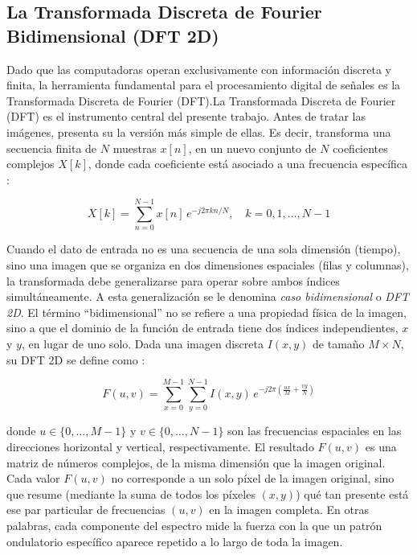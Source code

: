 \documentclass[conference]{IEEEtran}
\begin{document}
\subsection{La Transformada Discreta de Fourier Bidimensional (DFT 2D)}

Dado que las computadoras operan exclusivamente con información discreta y finita, la herramienta fundamental para el procesamiento digital de señales es la Transformada Discreta de Fourier (DFT).La Transformada Discreta de Fourier (DFT) es el instrumento central del presente trabajo. Antes de tratar las imágenes, presenta su la versión más simple de ellas. Es decir, transforma una secuencia finita de $N$ muestras $x[n]$, en un nuevo conjunto de $N$ coeficientes complejos $X[k]$, donde cada coeficiente está asociado a una frecuencia específica \cite{kulkarni, tan2020}:

\begin{equation}
    X[k] = \sum_{n=0}^{N-1} x[n]\, e^{-j2\pi kn/N}, \quad k = 0, 1, \ldots, N-1
    \label{eq:dft1d}
\end{equation}

Cuando el dato de entrada no es una secuencia de una sola dimensión (tiempo),
sino una imagen que se organiza en dos dimensiones espaciales (filas y columnas), la transformada debe generalizarse para operar sobre ambos índices simultáneamente. A esta generalización se le denomina \textit{caso
bidimensional} o \textit{DFT 2D}. El término ``bidimensional'' no se refiere a
una propiedad física de la imagen, sino a que el dominio de la función de
entrada tiene dos índices independientes, $x$ y $y$, en lugar de uno solo.
Dada una imagen discreta $I(x, y)$ de tamaño $M \times N$, su DFT 2D se define
como \cite{gonzalez2018, kulkarni}:

\begin{equation}
    F(u, v) = \sum_{x=0}^{M-1} \sum_{y=0}^{N-1} I(x,y)\,
              e^{-j2\pi\left(\frac{ux}{M} + \frac{vy}{N}\right)}
    \label{eq:dft2d}
\end{equation}

donde $u \in \{0, \ldots, M-1\}$ y $v \in \{0, \ldots, N-1\}$ son las
frecuencias espaciales en las direcciones horizontal y vertical,
respectivamente. El resultado $F(u, v)$ es una matriz de números complejos, de
la misma dimensión que la imagen original. Cada valor $F(u,v)$ no corresponde a
un solo píxel de la imagen original, sino que resume (mediante la suma de todos los píxeles $(x,y)$) qué tan presente está ese par particular de frecuencias $(u,v)$ en la imagen completa. En otras palabras, cada componente del espectro mide la fuerza con la que un patrón ondulatorio específico aparece repetido a lo largo de toda la imagen.
\end{document}
